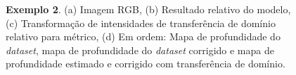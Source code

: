 \begin{figure}[H]
    \centering
    \caption{\textbf{Exemplo 2}. (a) Imagem RGB, (b) Resultado relativo do modelo, (c) Transformação de intensidades de transferência de domínio relativo para métrico, (d) Em ordem: Mapa de profundidade do \textit{dataset}, mapa de profundidade do \textit{dataset} corrigido e mapa de profundidade estimado e corrigido com transferência de domínio.}

    \label{ex2}
\end{figure}

